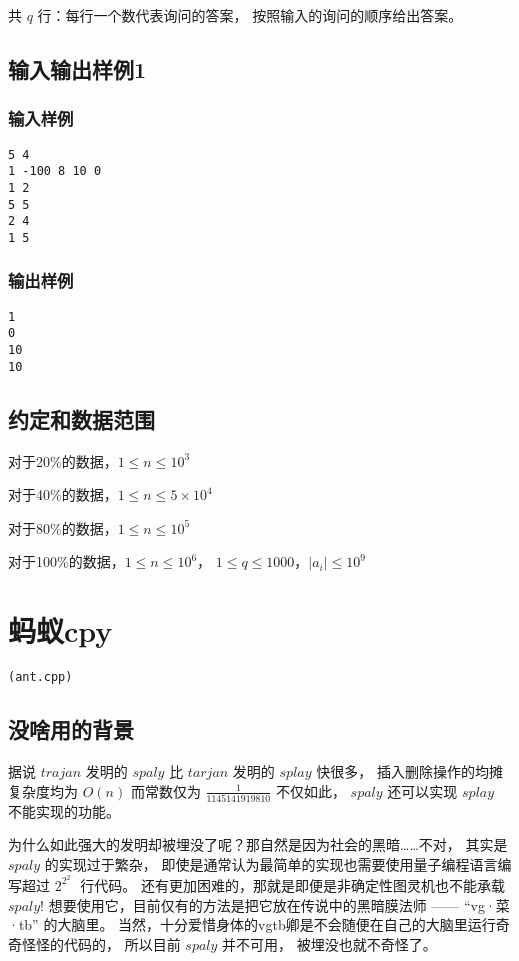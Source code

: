 \documentclass[UTF8]{ctexart}
\begin{document}
共 $q$ 行：每行一个数代表询问的答案， 按照输入的询问的顺序给出答案。

\subsection{输入输出样例1}

\subsubsection{输入样例}

\begin{lstlisting}
5 4
1 -100 8 10 0
1 2
5 5
2 4
1 5
\end{lstlisting}

\subsubsection{输出样例}

\begin{lstlisting}
1
0
10
10
\end{lstlisting}


\subsection{约定和数据范围}

对于20\%的数据，$1\le n \le 10^3$

对于40\%的数据，$1\le n \le 5\times 10^4$

对于80\%的数据，$1\le n \le 10^5$

对于100\%的数据，$1\le n \le 10^6$， $1\le q\le 1000$，$|a_i| \le 10^9$

\newpage
\section{蚂蚁cpy}
\begin{center}
\tt\large{(ant.cpp)}
\end{center}

\subsection{没啥用的背景}

据说 $trajan$ 发明的 $spaly$ 比 $tarjan$ 发明的 $splay$ 快很多， 插入删除操作的均摊复杂度均为 $O(n)$ 而常数仅为 $\frac{1}{1145141919810}$ 不仅如此， $spaly$ 还可以实现 $splay$ 不能实现的功能。

为什么如此强大的发明却被埋没了呢？那自然是因为社会的黑暗……不对， 其实是 $spaly$ 的实现过于繁杂， 即使是通常认为最简单的实现也需要使用量子编程语言编写超过 $2^{2^{2^{\cdots}}}$ 行代码。 还有更加困难的，那就是即便是非确定性图灵机也不能承载 $spaly$! 想要使用它，目前仅有的方法是把它放在传说中的黑暗膜法师 —— “vg·菜·tb” 的大脑里。 当然，十分爱惜身体的vgtb卿是不会随便在自己的大脑里运行奇奇怪怪的代码的， 所以目前 $spaly$ 并不可用， 被埋没也就不奇怪了。
\end{document}

